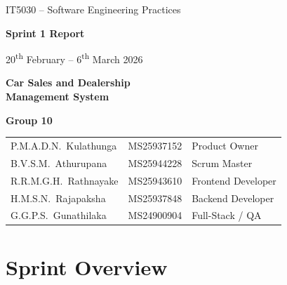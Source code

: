 \documentclass[12pt,a4paper]{article}
\begin{document}
\begin{titlepage}
\thispagestyle{empty}
\begin{center}
\vspace*{2cm}

{\large\color{black!60} IT5030 -- Software Engineering Practices}

\vspace{1cm}

{\Huge\bfseries\color{DarkText} Sprint 1 Report}

\vspace{0.3cm}

{\large\color{black!50} 20\textsuperscript{th} February -- 6\textsuperscript{th} March 2026}

\vspace{0.8cm}

{\LARGE\bfseries\color{black!70} Car Sales and Dealership\\Management System}

\vspace{2cm}

{\Large\bfseries\color{DarkText} Group 10}

\vspace{0.8cm}

\begin{tabular}{l l l}
P.M.A.D.N.\ Kulathunga & MS25937152 & Product Owner \\
B.V.S.M.\ Athurupana   & MS25944228 & Scrum Master \\
R.R.M.G.H.\ Rathnayake & MS25943610 & Frontend Developer \\
H.M.S.N.\ Rajapaksha   & MS25937848 & Backend Developer \\
G.G.P.S.\ Gunathilaka  & MS24900904 & Full-Stack / QA \\
\end{tabular}

\end{center}
\end{titlepage}

\newpage
\tableofcontents
\newpage

\section{Sprint Overview}
\end{document}
